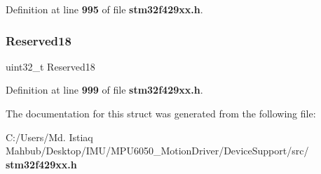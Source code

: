 Definition at line \textbf{ 995} of file \textbf{ stm32f429xx.\+h}.

\mbox{\label{structUSB__OTG__INEndpointTypeDef_a716e172ed03ae049eb501ad83207b4ed}} 
\subsubsection{Reserved18}
{\footnotesize\ttfamily uint32\+\_\+t Reserved18}



Definition at line \textbf{ 999} of file \textbf{ stm32f429xx.\+h}.



The documentation for this struct was generated from the following file\+:\begin{DoxyCompactItemize}
\item 
C\+:/\+Users/\+Md. Istiaq Mahbub/\+Desktop/\+I\+M\+U/\+M\+P\+U6050\+\_\+\+Motion\+Driver/\+Device\+Support/src/\textbf{ stm32f429xx.\+h}\end{DoxyCompactItemize}
